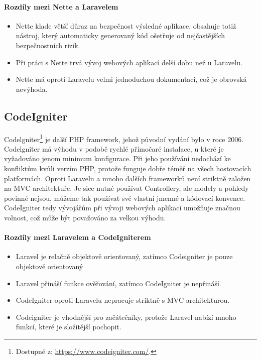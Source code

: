 \paragraph{Rozdíly mezi Nette a Laravelem}
\begin{itemize}
  \item{Nette klade větší důraz na bezpečnost výsledné aplikace, obsahuje totiž nástroj, který automaticky generovaný kód ošetřuje od nejčastějších bezpečnostních rizik.}
  \item{Při práci s Nette trvá vývoj webových aplikací delší dobu než u Laravelu.}
  \item{Nette má oproti Laravelu velmi jednoduchou dokumentaci, což je obrovská nevýhoda.}
  
\end{itemize}

\subsection*{CodeIgniter}
Codelgniter\footnote{Dostupné z: \url{https://www.codeigniter.com/}.} je další PHP framework, jehož původní vydání bylo v roce 2006. Codelgniter má výhodu v podobě rychlé přímočaré instalace, u které je vyžadováno jenom minimum konfigurace. Při jeho používání nedochází ke konfliktům kvůli verzím PHP, protože funguje dobře téměř na všech hostovacích platformách.
Oproti Laravelu a mnoho dalších frameworků není striktně založen na MVC architektuře. Je sice nutné používat Controllery, ale modely a pohledy povinné nejsou, můžeme tak používat své vlastní jmenné a kódovací konvence. CodeIgniter tedy vývojářům při vývoji webových aplikací umožňuje značnou volnost, což může být považováno za velkou výhodu. \cite{top10}



\paragraph{Rozdíly mezi Laravelem a CodeIgniterem \cite{codeigniterlaravel}}
\begin{itemize}
  \item{Laravel je relačně objektově orientovaný, zatímco Codeigniter  je pouze objektově orientovaný}
  \item{Laravel přináší funkce ověřování, zatímco CodeIgniter je nepřináší.}
  \item{CodeIgniter oproti Laravelu nepracuje striktně s MVC architekturou.}
  \item{Codeigniter je vhodnější pro začátečníky, protože Laravel nabízí mnoho funkcí, které je složitější pochopit.}
\end{itemize}

